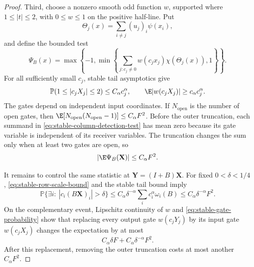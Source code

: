 \begin{proof}
Third, choose a nonzero smooth odd function \(w\), supported where
\(1\le|t|\le2\), with \(0\le w\le1\) on the positive half-line.
Put
\[
 \Theta_j(x)=\sum_{i\ne j}(u_j)_i\psi(x_i),
\]
and define the bounded test
\begin{equation}
 \Psi_B(x)=\max\left\{-1,\min\left\{
 \sum_{j:c_j\ne0}w(c_jx_j)\chi(\Theta_j(x)),1\right\}\right\}.
 \label{eq:stable-column-detection-test}
\end{equation}
For all sufficiently small \(c_j\), stable tail asymptotics give
\begin{equation}
 \mathbb P(1\le|c_jX_j|\le2)\le C_\alpha c_j^\alpha,
 \qquad
 \E|w(c_jX_j)|\ge c_\alpha c_j^\alpha.
 \label{eq:stable-gate-probability}
\end{equation}
The gates depend on independent input coordinates.
If \(N_{\mathrm{open}}\) is the number of open gates, then
\(\E[N_{\mathrm{open}}(N_{\mathrm{open}}-1)]\le C_\alpha F^2\).
Before the outer truncation, each summand in
\eqref{eq:stable-column-detection-test} has mean zero because its gate variable
is independent of its receiver variables.
The truncation changes the sum only when at least two gates are open, so
\begin{equation}
 |\E\Psi_B(\mathbf X)|\le C_\alpha F^2.
 \label{eq:stable-column-detection-input-mean}
\end{equation}

It remains to control the same statistic at
\(\mathbf Y=(I+B)\mathbf X\).
For fixed \(0<\delta<1/4\),
\eqref{eq:stable-row-scale-bound} and the stable tail bound imply
\begin{equation}
 \mathbb P\{\exists i:\ |c_i(B\mathbf X)_i|>\delta\}
 \le C_\alpha\delta^{-\alpha}\sum_i c_i^\alpha\omega_i(B)
 \le C_\alpha\delta^{-\alpha}F^2.
 \label{eq:stable-output-gate-exception}
\end{equation}
On the complementary event, Lipschitz continuity of \(w\) and
\eqref{eq:stable-gate-probability} show that replacing every output
gate \(w(c_jY_j)\) by its input gate \(w(c_jX_j)\) changes the expectation
by at most
\begin{equation}
 C_\alpha\delta F+C_\alpha\delta^{-\alpha}F^2.
 \label{eq:stable-output-gate-error}
\end{equation}
After this replacement, removing the outer truncation costs at most another
\(C_\alpha F^2\).


\end{proof}
